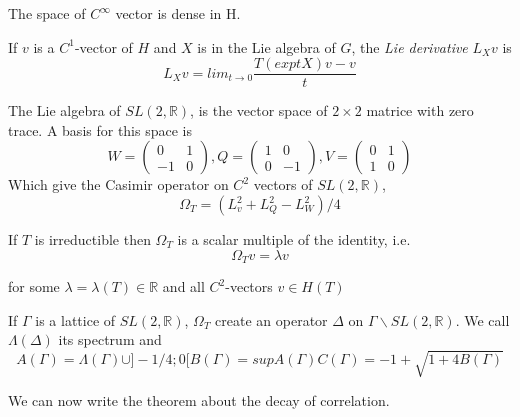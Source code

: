 \begin{rmq}
The space of $C^{\infty}$ vector is dense in H.
\end{rmq}

\begin{dfnt}
If $v$ is a $C^1$-vector of $H$ and $X$ is in the Lie algebra of $G$, the \emph{Lie derivative} $L_X v$ is \[
L_X v =lim_{t \to 0} \frac{T(exp tX)v-v}{t}
\]
\end{dfnt}

The Lie algebra of $SL(2,\mathbb{R})$, is the vector space of $2 \times 2$ matrice with zero trace. A basis for this space is \[
W=\begin{pmatrix} 0 & 1 \\ -1 & 0 \end{pmatrix}, Q=\begin{pmatrix} 1 & 0 \\ 0 & -1 \end{pmatrix}, V=\begin{pmatrix} 0 & 1 \\ 1 & 0 \end{pmatrix}
\]
Which give the Casimir operator on $C^2$ vectors of $SL(2,\mathbb{R})$, \[
\Omega_T = (L_v^2+L_Q^2-L_W^2)/4
\]

If $T$ is irreductible then $\Omega_T$ is a scalar multiple of the identity, i.e. \[
\Omega_T v = \lambda v
\]

for some $\lambda=\lambda(T)\in \mathbb{R}$ and all $C^2$-vectors $v \in H(T)$

If $\Gamma$ is a lattice of $SL(2,\mathbb{R})$, $\Omega_T$ create an operator $\Delta$ on $\Gamma \backslash SL(2,\mathbb{R})$. We call $\Lambda(\Delta)$ its spectrum and\[
A(\Gamma)=\Lambda(\Gamma) \cup ]-1/4;0[
B(\Gamma)=sup A(\Gamma)
C(\Gamma)= -1 + \sqrt{1+4 B(\Gamma)}
\]

We can now write the theorem about the decay of correlation.

